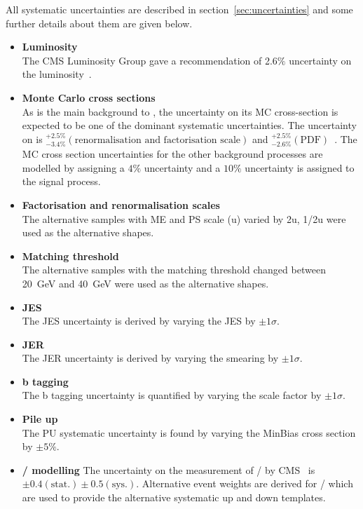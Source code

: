 All systematic uncertainties are described in section~\ref{sec:uncertainties} and some further details about them are given below.

\begin{itemize}
\item \textbf{Luminosity}\\
The CMS Luminosity Group gave a recommendation of 2.6$\%$ uncertainty on the luminosity~\cite{CMS-PAS-LUM-12-001}.
\item \textbf{Monte Carlo cross sections}\\
As \ttbar is the main background to \tttt, the uncertainty on its MC cross-section is expected to be one of the dominant systematic uncertainties. The uncertainty on \ttbar is ${}^{+2.5\%}_{-3.4\%} \left( \textrm{renormalisation and factorisation scale} \right)$ and ${}^{+2.5\%}_{-2.6\%} \left( \textrm{PDF} \right)$~\cite{PhysRevLett.110.252004}. The MC cross section uncertainties for the other background processes are modelled by assigning a $4\%$ uncertainty and a $10\%$ uncertainty is assigned to the signal process.
\item \textbf{Factorisation and renormalisation scales}\\
The alternative \ttbar samples with ME and PS scale (u) varied by 2u, 1/2u were used as the alternative shapes.
\item \textbf{Matching threshold}\\
The alternative \ttbar samples with the matching threshold changed between 20~GeV and 40~GeV were used as the alternative shapes.
\item \textbf{JES}\\
The JES uncertainty is derived by varying the JES by $\pm1\sigma$.
\item \textbf{JER}\\
The JER uncertainty is derived by varying the smearing by $\pm1\sigma$.
\item \textbf{b tagging}\\
The b tagging uncertainty is quantified by varying the scale factor by $\pm1\sigma$.
\item \textbf{Pile up}\\
The PU systematic uncertainty is found by varying the MinBias cross section by $\pm5\%$.
\item \textbf{\heavyflavourone / \heavyflavourtwo modelling}
The uncertainty on the measurement of \heavyflavourone / \heavyflavourtwo by CMS~\cite{Khachatryan2015132} is $\pm 0.4 \left( \textrm{stat.} \right) \pm 0.5 \left(\textrm{sys.} \right)$. Alternative event weights are derived for \heavyflavourone / \heavyflavourtwo which are used to provide the alternative systematic up and down templates.
 \end{itemize}
